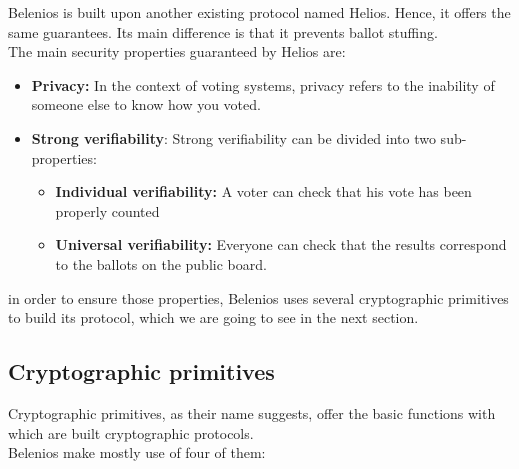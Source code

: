 \documentclass[12pt, a4paper]{report}
\begin{document}
Belenios is built upon another existing protocol named Helios. Hence, it offers the same guarantees. Its main difference is that it prevents ballot stuffing. \cite{BOOK:1} \\

The main security properties guaranteed by Helios are:

\begin{itemize}

\item \textbf{Privacy:} In the context of voting systems, privacy refers to the inability of someone else to know how you voted. \cite{BOOK:1}

\item \textbf{Strong verifiability}: Strong verifiability can be divided into two sub-properties: \cite{BOOK:1}
\begin{itemize}
	\item \textbf{Individual verifiability:} A voter can check that his vote has been properly 													  counted
	\item \textbf{Universal verifiability:} Everyone can check that the results correspond to the 												 ballots on the public board.
\end{itemize}

\end{itemize}

in order to ensure those properties, Belenios uses several cryptographic primitives to build its protocol, which we are going to see in the next section. 


\subsection{Cryptographic primitives}

Cryptographic primitives, as their name suggests, offer the basic functions with which are built cryptographic protocols.\\
 
Belenios make mostly use of four of them:
\end{document}
